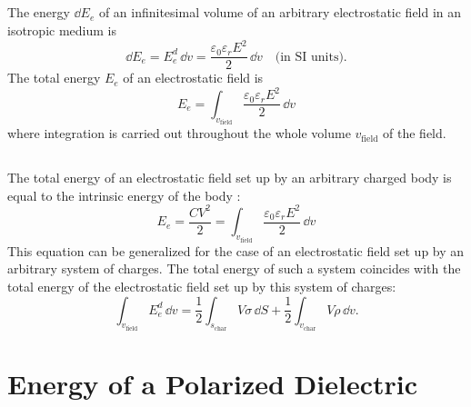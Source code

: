 \subsection{}\label{19.1.5} The energy $\dd E_{e}$ of an infinitesimal volume of an arbitrary electrostatic field in an isotropic medium is
\begin{equation*}%
\dd E_{e} = E_{e}^{d} \, \dd v = \frac{\varepsilon_{0}\varepsilon_{r}E^{2}}{2} \, \dd v \quad \text{(in SI units).}
\end{equation*}
The total energy $E_{e}$ of an electrostatic field is
\begin{equation*}%
 E_{e} = \int_{v_{\text{field}}} \frac{\varepsilon_{0}\varepsilon_{r}E^{2}}{2} \, \dd v 
\end{equation*}
where integration is carried out throughout the whole volume $v_{\text{field}}$ of the field.


\subsection{}\label{19.1.6} The total energy of an electrostatic field set up by an arbitrary charged body is equal to the intrinsic energy of the body :
\begin{equation*}%
E_{e} = \frac{CV^{2}}{2} = \int_{v_{\text{field}}} \frac{\varepsilon_{0}\varepsilon_{r}E^{2}}{2} \, \dd v 
\end{equation*}
This equation can be generalized for the case of an electrostatic field set up by an arbitrary system of charges. The total energy of such a system  coincides with the total energy of the electrostatic field set up by this system of charges:
\begin{equation*}%
\int_{v_{\text{field}}} E_{e}^{d} \, \dd v = \frac{1}{2} \int_{s_{\text{char}}} V \sigma \, \dd S + \frac{1}{2} \int_{v_{\text{char}}} V \rho \, \dd v.
\end{equation*}


\section{Energy of a Polarized Dielectric}
\label{sec-19.2}


